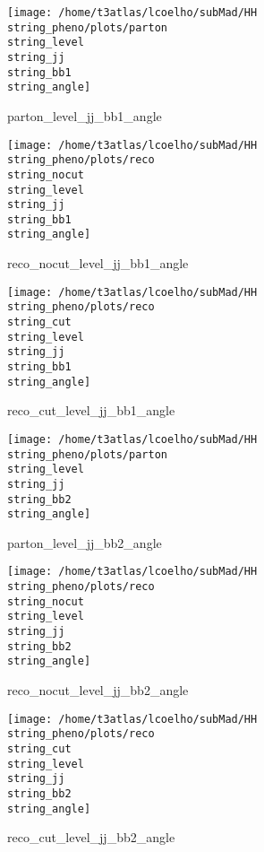 \documentclass[a4paper,onecolumn,final,11pt]{article}
\begin{document}
\begin{figure}[H] 
\centering 
\begin{minipage}{.32\textwidth} 
        \centering 
        \hspace{0cm} 
        \texttt{[image: /home/t3atlas/lcoelho/subMad/HH\\string\_pheno/plots/parton\\string\_level\\string\_jj\\string\_bb1\\string\_angle]} 
        \caption{parton_level_jj_bb1_angle} 
\end{minipage} 
\hfill 
\begin{minipage}{.32\textwidth} 
        \centering 
        \hspace{0cm} 
    \texttt{[image: /home/t3atlas/lcoelho/subMad/HH\\string\_pheno/plots/reco\\string\_nocut\\string\_level\\string\_jj\\string\_bb1\\string\_angle]} 
        \caption{reco_nocut_level_jj_bb1_angle} 
\end{minipage} 
\hfill 
\begin{minipage}{.32\textwidth} 
        \centering 
        \hspace{0cm} 
    \texttt{[image: /home/t3atlas/lcoelho/subMad/HH\\string\_pheno/plots/reco\\string\_cut\\string\_level\\string\_jj\\string\_bb1\\string\_angle]} 
        \caption{reco_cut_level_jj_bb1_angle} 
\end{minipage} 
\end{figure} 
 
\begin{figure}[H] 
\centering 
\begin{minipage}{.32\textwidth} 
        \centering 
        \hspace{0cm} 
        \texttt{[image: /home/t3atlas/lcoelho/subMad/HH\\string\_pheno/plots/parton\\string\_level\\string\_jj\\string\_bb2\\string\_angle]} 
        \caption{parton_level_jj_bb2_angle} 
\end{minipage} 
\hfill 
\begin{minipage}{.32\textwidth} 
        \centering 
        \hspace{0cm} 
    \texttt{[image: /home/t3atlas/lcoelho/subMad/HH\\string\_pheno/plots/reco\\string\_nocut\\string\_level\\string\_jj\\string\_bb2\\string\_angle]} 
        \caption{reco_nocut_level_jj_bb2_angle} 
\end{minipage} 
\hfill 
\begin{minipage}{.32\textwidth} 
        \centering 
        \hspace{0cm} 
    \texttt{[image: /home/t3atlas/lcoelho/subMad/HH\\string\_pheno/plots/reco\\string\_cut\\string\_level\\string\_jj\\string\_bb2\\string\_angle]} 
        \caption{reco_cut_level_jj_bb2_angle} 
\end{minipage} 
\end{figure} 
 
\end{document}
